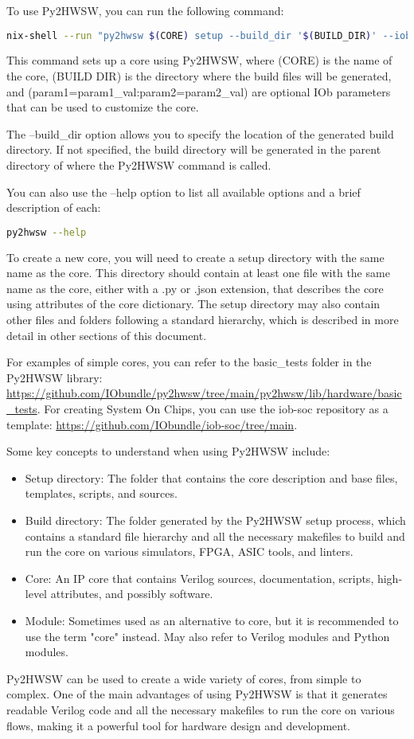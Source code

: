 %

To use Py2HWSW, you can run the following command:
\begin{lstlisting}[language=bash]
nix-shell --run "py2hwsw $(CORE) setup --build_dir '$(BUILD_DIR)' --iob_params 'param1=param1_val:param2=param2_val"
\end{lstlisting}
This command sets up a core using Py2HWSW, where (CORE) is the name of the core, (BUILD DIR) is the directory where the build files will be generated, and (param1=param1\_val:param2=param2\_val) are optional IOb parameters that can be used to customize the core.

The --build\_dir option allows you to specify the location of the generated build directory. If not specified, the build directory will be generated in the parent directory of where the Py2HWSW command is called.

You can also use the --help option to list all available options and a brief description of each:
\begin{lstlisting}[language=bash]
py2hwsw --help
\end{lstlisting}

To create a new core, you will need to create a setup directory with the same name as the core. This directory should contain at least one file with the same name as the core, either with a .py or .json extension, that describes the core using attributes of the core dictionary. The setup directory may also contain other files and folders following a standard hierarchy, which is described in more detail in other sections of this document.

For examples of simple cores, you can refer to the basic\_tests folder in the Py2HWSW library: \url{https://github.com/IObundle/py2hwsw/tree/main/py2hwsw/lib/hardware/basic_tests}. For creating System On Chips, you can use the iob-soc repository as a template: \url{https://github.com/IObundle/iob-soc/tree/main}.

Some key concepts to understand when using Py2HWSW include:

\begin{itemize}
  \item Setup directory: The folder that contains the core description and base files, templates, scripts, and sources.
  \item Build directory: The folder generated by the Py2HWSW setup process, which contains a standard file hierarchy and all the necessary makefiles to build and run the core on various simulators, FPGA, ASIC tools, and linters.
  \item Core: An IP core that contains Verilog sources, documentation, scripts, high-level attributes, and possibly software.
  \item Module: Sometimes used as an alternative to core, but it is recommended to use the term "core" instead. May also refer to Verilog modules and Python modules.
\end{itemize}

Py2HWSW can be used to create a wide variety of cores, from simple to complex. One of the main advantages of using Py2HWSW is that it generates readable Verilog code and all the necessary makefiles to run the core on various flows, making it a powerful tool for hardware design and development.
